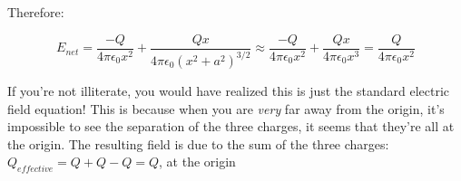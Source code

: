 \begin{solution}
Therefore:

\begin{equation*}
    E_{net} = \frac{-Q}{4\pi\epsilon_0x^2} +
              \frac{Qx}{4\pi\epsilon_0(x^2+a^2)^{3/2}}
            \approx
              \frac{-Q}{4\pi\epsilon_0x^2} +
              \frac{Qx}{4\pi\epsilon_0x^3}
            =
              \frac{Q}{4\pi\epsilon_0x^2}
\end{equation*}

If you're not illiterate, you would have realized this is just the standard electric field equation! This is because when you are \emph{very} far away from the origin, it's impossible to see the separation of the three charges, it seems that they're all at the origin. The resulting field is due to the sum of the three charges: $Q_{effective}=Q+Q-Q=Q$, at the origin

\end{solution}


